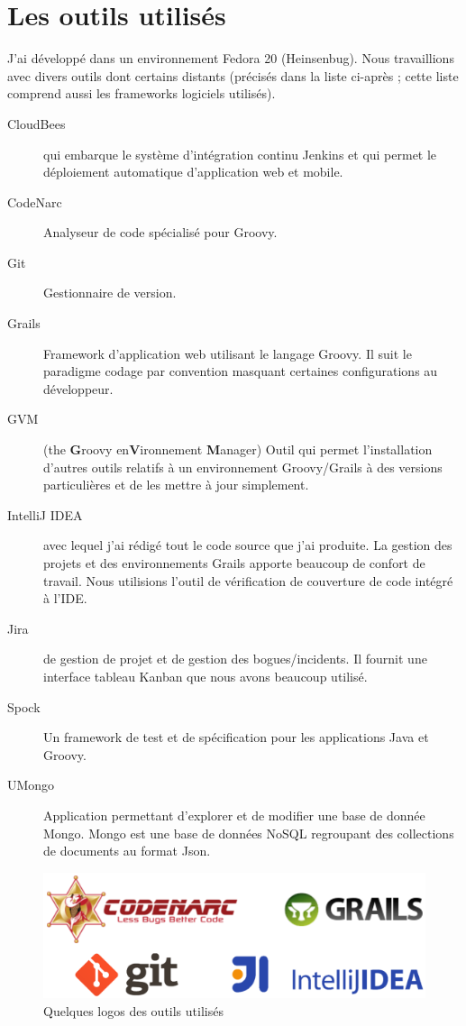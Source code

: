 \section{Les outils utilisés}
J'ai développé dans un environnement Fedora 20 (Heinsenbug).
Nous travaillions avec divers outils dont certains distants (précisés dans la
liste ci-après ; cette liste comprend aussi les frameworks logiciels utilisés).
\begin{description}
  \item[CloudBees]  qui embarque le système d'intégration continu
	Jenkins et qui permet le déploiement automatique d'application web et
	mobile.
  \item[CodeNarc] Analyseur de code spécialisé pour Groovy.
  \item[Git] Gestionnaire de version.
  \item[Grails] Framework d'application web utilisant le langage Groovy. Il suit
	le paradigme \og codage par convention \fg{} masquant certaines
	configurations au développeur.
  \item[GVM] (the {\bf G}roovy en{\bf V}ironnement {\bf M}anager) Outil qui
	permet l'installation d'autres outils relatifs à un environnement
	Groovy/Grails à des versions particulières et de les mettre à jour
	simplement.
  \item[IntelliJ IDEA]  avec lequel j'ai rédigé tout le code source
	que j'ai produite. La gestion des projets et des environnements Grails
	apporte beaucoup de confort de travail. Nous utilisions l'outil de
	vérification de couverture de code intégré à l'IDE.
  \item[Jira]  de gestion de projet et de gestion des bogues/incidents. Il
	fournit une interface \og tableau Kanban \fg{} que nous avons beaucoup utilisé.
  \item[Spock] Un framework de test et de spécification pour les applications
	Java et Groovy.
  \item[UMongo] Application permettant d'explorer et de modifier une base de
	donnée Mongo. Mongo est une base de données NoSQL regroupant des collections
	de documents au format Json.
\end{description}

\begin{figure}[h]
  \centering
  \includegraphics[width=15cm]{images/logos}
  \caption{Quelques logos des outils utilisés}
  \label{fig:logos}
\end{figure}
